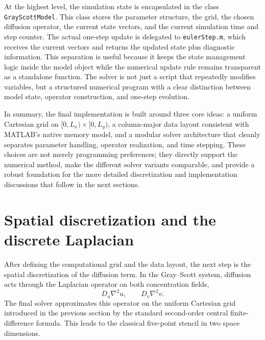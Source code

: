 At the highest level, the simulation state is encapsulated in the class \texttt{GrayScottModel}. This class stores the parameter structure, the grid, the chosen diffusion operator, the current state vectors, and the current simulation time and step counter. The actual one-step update is delegated to \texttt{eulerStep.m}, which receives the current vectors and returns the updated state plus diagnostic information. This separation is useful because it keeps the state management logic inside the model object while the numerical update rule remains transparent as a standalone function. The solver is not just a script that repeatedly modifies variables, but a structured numerical program with a clear distinction between model state, operator construction, and one-step evolution.

In summary, the final implementation is built around three core ideas: a uniform Cartesian grid on $[0,L_x)\times[0,L_y)$, a column-major data layout consistent with MATLAB's native memory model, and a modular solver architecture that cleanly separates parameter handling, operator realization, and time stepping. These choices are not merely programming preferences; they directly support the numerical method, make the different solver variants comparable, and provide a robust foundation for the more detailed discretization and implementation discussions that follow in the next sections.

\section{Spatial discretization and the discrete Laplacian}
\label{sec:numimpl_spatial_laplacian}

After defining the computational grid and the data layout, the next step is the spatial discretization of the diffusion term. In the Gray--Scott system, diffusion acts through the Laplacian operator on both concentration fields,
\[
D_u \nabla^2 u,
\qquad
D_v \nabla^2 v.
\]
The final solver approximates this operator on the uniform Cartesian grid introduced in the previous section by the standard second-order central finite-difference formula. This leads to the classical five-point stencil in two space dimensions.

